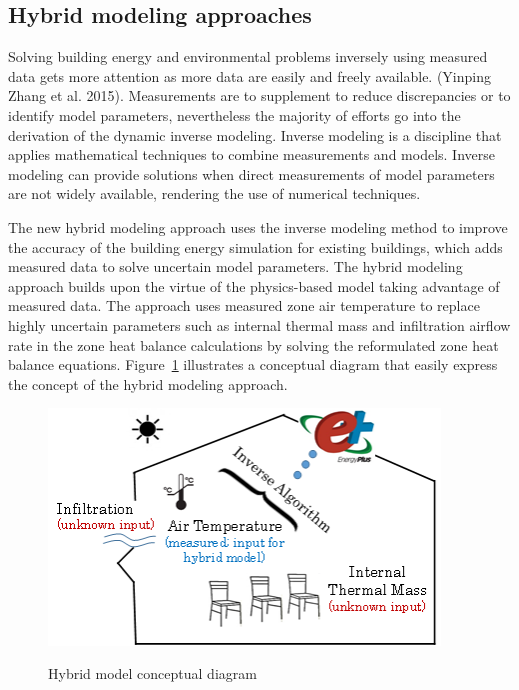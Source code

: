\subsection{Hybrid modeling approaches}\label{hybrid-modeling-approaches}

Solving building energy and environmental problems inversely using measured data gets more attention as more data are easily and freely available. (Yinping Zhang et al. 2015). Measurements are to supplement to reduce discrepancies or to identify model parameters, nevertheless the majority of efforts go into the derivation of the dynamic inverse modeling. Inverse modeling is a discipline that applies mathematical techniques to combine measurements and models. Inverse modeling can provide solutions when direct measurements of model parameters are not widely available, rendering the use of numerical techniques.

The new hybrid modeling approach uses the inverse modeling method to improve the accuracy of the building energy simulation for existing buildings, which adds measured data to solve uncertain model parameters. The hybrid modeling approach builds upon the virtue of the physics-based model taking advantage of measured data. The approach uses measured zone air temperature to replace highly uncertain parameters such as internal thermal mass and infiltration airflow rate in the zone heat balance calculations by solving the reformulated zone heat balance equations. Figure~\ref{fig:hybrid-model-conceptual-diagram} illustrates a conceptual diagram that easily express the concept of the hybrid modeling approach. 


\begin{figure}[h]
\begin{center}
\includegraphics[width=295pt]{media/img_HybridModel-1.png}
\caption{Hybrid model conceptual diagram}\protect \label{fig:hybrid-model-conceptual-diagram}
\end{center}
\end{figure}
{\small  }


